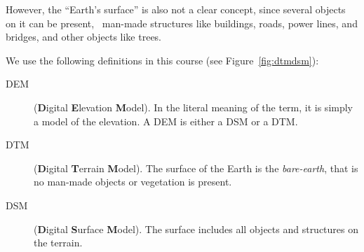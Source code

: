 However, the ``Earth's surface'' is also not a clear concept, since several objects on it can be present, \eg\ man-made structures like buildings, roads, power lines, and bridges, and other objects like trees.

We use the following definitions in this course (see Figure~\ref{fig:dtmdsm}):
\begin{description}
  \item[DEM] (\textbf{D}igital \textbf{E}levation \textbf{M}odel). In the literal meaning of the term, it is simply a model of the elevation. A DEM is either a DSM or a DTM\@. 
  \item[DTM] (\textbf{D}igital \textbf{T}errain \textbf{M}odel). The surface of the Earth is the \emph{bare-earth}, that is no man-made objects or vegetation is present. 
  \item[DSM] (\textbf{D}igital \textbf{S}urface \textbf{M}odel). The surface includes all objects and structures on the terrain.
\end{description}

